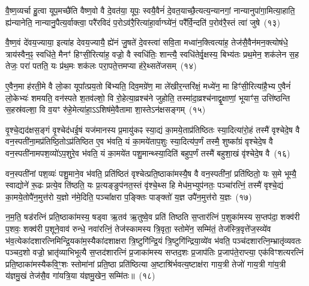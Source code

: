 {\anuvakamend[{अथ॑ ददते॒ स्वया॒ सन्थ्स्व॑धाका॒रो हि वि॑न्दति}]}%

वै॒ष्ण॒व्यर्चा हु॒त्वा यूप॒मच्छै॑ति वैष्ण॒वो वै दे॒वत॑या॒ यूपः॒ स्वयै॒वैनं॑ दे॒वत॒याच्छै॒त्यत्य॒न्यानगां॒ नान्यानुपा॑गा॒मित्या॒हाति॒ ह्य॑न्यानेति॒ नान्यानु॒पैत्य॒र्वाक्त्वा॒ परै॑रविदं प॒रो\-ऽव॑रै॒रित्या॑हा॒र्वाग्घ्ये॑नं॒ परै᳚र्वि॒न्दति॑ प॒रोव॑रै॒स्तं त्वा॑ जुषे~(१३)

वै॒ष्ण॒वं दे॑वय॒ज्याया॒ इत्या॑ह देवय॒ज्यायै॒ ह्ये॑नं जु॒षते॑ दे॒वस्त्वा॑ सवि॒ता मध्वा॑न॒क्त्वित्या॑ह॒ तेज॑सै॒वैन॑मन॒क्त्योष॑धे॒ त्राय॑स्वैन॒ꣴ॒ स्वधि॑ते॒ मैनꣳ॑ हिꣳसी॒रित्या॑ह॒ वज्रो॒ वै स्वधि॑तिः॒ शान्त्यै॒ स्वधि॑तेर्वृ॒क्षस्य॒ बिभ्य॑तः प्रथ॒मेन॒ शक॑लेन स॒ह तेजः॒ परा॑ पतति॒ यः प्र॑थ॒मः शक॑लः परा॒पते॒त्तमप्या ह॑रे॒थ्सते॑जसम्~(१४)

ए॒वैन॒मा ह॑रती॒मे वै लो॒का यूपा᳚त्प्रय॒तो बि॑भ्यति॒ दिव॒मग्रे॑ण॒ मा ले॑खीर॒न्तरि॑क्षं॒ मध्ये॑न॒ मा हिꣳ॑सी॒रित्या॑है॒भ्य ए॒वैनं॑ लो॒केभ्यः॑ शमयति॒ वन॑स्पते श॒तव॑ल्\mbox{}शो॒ वि रो॒हेत्या॒व्रश्च॑ने जुहोति॒ तस्मा॑दा॒व्रश्च॑नाद्वृ॒क्षाणां॒ भूयाꣳ॑स॒ उत्ति॑ष्ठन्ति स॒हस्र॑वल्\mbox{}शा॒ वि व॒यꣳ रु॑हे॒मेत्या॑हा॒\-ऽऽ\-शिष॑मे॒वैतामा शा॒स्ते\-ऽन॑क्षसङ्गम्~(१५)

वृ॒श्चे॒द्यद॑क्षस॒ङ्गं वृ॒श्चेद॑धई॒षं यज॑मानस्य प्र॒मायु॑कꣴ स्या॒द्यं का॒मये॒ताप्र॑तिष्ठितः स्या॒दित्या॑रो॒हं तस्मै॑ वृश्चेदे॒ष वै वन॒स्पती॑ना॒मप्र॑तिष्ठि॒तो\-ऽप्र॑तिष्ठित ए॒व भ॑वति॒ यं का॒मये॑ताप॒शुः स्या॒दित्य॑प॒र्णं तस्मै॒ शुष्का᳚ग्रं वृश्चेदे॒ष वै वन॒स्पती॑नामपश॒व्यो॑\-ऽप॒शुरे॒व भ॑वति॒ यं का॒मये॑त पशु॒मान्थ्स्या॒दिति॑ बहुप॒र्णं तस्मै॑ बहुशा॒खं वृ॑श्चेदे॒ष वै~(१६)

वन॒स्पती॑नां पश॒व्यः॑ पशु॒माने॒व भ॑वति॒ प्रति॑ष्ठितं वृश्चेत्प्रति॒ष्ठाका॑मस्यै॒ष वै वन॒स्पती॑नां॒ प्रति॑ष्ठितो॒ यः स॒मे भूम्यै॒ स्वाद्योने॑ रू॒ढः प्रत्ये॒व ति॑ष्ठति॒ यः प्र॒त्यङ्ङुप॑नत॒स्तं वृ॑श्चे॒थ्स हि मेध॑म॒भ्युप॑नतः॒ पञ्चा॑रत्निं॒ तस्मै॑ वृश्चे॒द्यं का॒मये॒तोपै॑न॒मुत्त॑रो य॒ज्ञो न॑मे॒दिति॒ पञ्चा᳚क्षरा प॒ङ्क्तिः पाङ्क्तो॑ य॒ज्ञ उपै॑न॒मुत्त॑रो य॒ज्ञः~(१७)

न॒म॒ति॒ षड॑रत्निं प्रति॒ष्ठाका॑मस्य॒ षड्वा ऋ॒तव॑ ऋ॒तुष्वे॒व प्रति॑ तिष्ठति स॒प्तार॑त्निं प॒शुका॑मस्य स॒प्तप॑दा॒ शक्व॑री प॒शवः॒ शक्व॑री प॒शूने॒वाव॑ रुन्धे॒ नवा॑रत्निं॒ तेज॑स्कामस्य त्रि॒वृता॒ स्तोमे॑न॒ सम्मि॑तं॒ तेज॑स्त्रि॒वृत्ते॑ज॒स्व्ये॑व भ॑व॒त्येका॑\-दशारत्नि\-मिन्द्रि॒यका॑म॒स्यैका॑\-दशाक्षरा त्रि॒ष्टुगि॑न्द्रि॒यं त्रि॒ष्टुगि॑न्द्रिया॒व्ये॑व भ॑वति॒ पञ्च॑दशारत्नि॒म्भ्रातृ॑व्यवतः पञ्चद॒शो वज्रो॒ भ्रातृ॑व्याभिभूत्यै स॒प्तद॑शारत्निं प्र॒जाका॑मस्य सप्तद॒शः प्र॒जा\-प॑तिः प्र॒जा\-प॑ते॒राप्त्या॒ एक॑विꣳशत्यरत्निं प्रति॒ष्ठाका॑मस्यैक\-वि॒ꣳ॒शः स्तोमा॑नां प्रति॒ष्ठा प्रति॑ष्ठित्या अ॒ष्टाश्रि॑र्भवत्य॒ष्टाक्ष॑रा गाय॒त्री तेजो॑ गाय॒त्री गा॑य॒त्री य॑ज्ञमु॒खं तेज॑सै॒व गा॑यत्रि॒या य॑ज्ञमु॒खेन॒ सम्मि॑तः॥~(१८)

